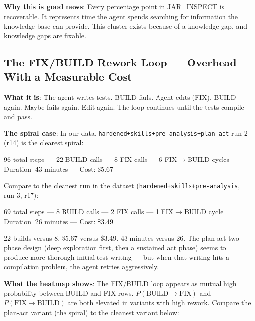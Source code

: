 \documentclass[11pt,a4paper]{article}
\begin{document}
\textbf{Why this is good news}:
Every percentage point in JAR\_INSPECT is recoverable.
It represents time the agent spends searching for information the knowledge base can provide.
This cluster exists because of a knowledge gap, and knowledge gaps are fixable.

\subsection{The FIX/BUILD Rework Loop --- Overhead With a Measurable Cost}

\textbf{What it is}:
The agent writes tests. BUILD fails. Agent edits (FIX). BUILD again. Maybe fails again.
Edit again. The loop continues until the tests compile and pass.

\textbf{The spiral case}:
In our data, \texttt{hardened+skills+pre-analysis+plan-act} run 2 (r14) is the clearest spiral:

\begin{codebox}
96 total steps --- 22 BUILD calls --- 8 FIX calls --- 6 FIX$\to$BUILD cycles
Duration: 43 minutes --- Cost: \$5.67
\end{codebox}

Compare to the cleanest run in the dataset (\texttt{hardened+skills+pre-analysis}, run 3, r17):

\begin{codebox}
69 total steps --- 8 BUILD calls --- 2 FIX calls --- 1 FIX$\to$BUILD cycle
Duration: 26 minutes --- Cost: \$3.49
\end{codebox}

22 builds versus 8. \$5.67 versus \$3.49. 43 minutes versus 26.
The plan-act two-phase design (deep exploration first, then a sustained act phase)
seems to produce more thorough initial test writing ---
but when that writing hits a compilation problem, the agent retries aggressively.

\textbf{What the heatmap shows}:
The FIX/BUILD loop appears as mutual high probability between BUILD and FIX rows.
$P(\text{BUILD} \to \text{FIX})$ and $P(\text{FIX} \to \text{BUILD})$ are both elevated
in variants with high rework.
Compare the plan-act variant (the spiral) to the cleanest variant below:
\end{document}
